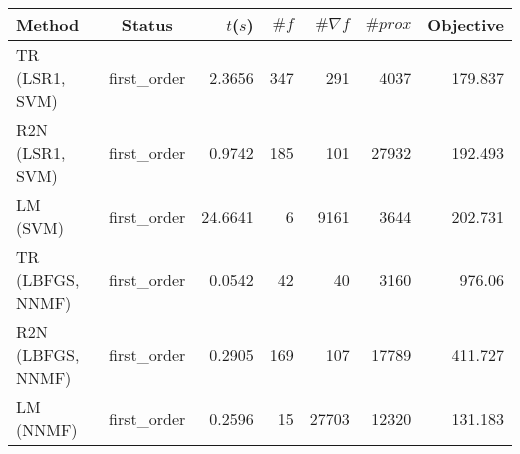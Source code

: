 \begin{tabular}{lcrrrrr}
  \hline
  \textbf{Method} & \textbf{Status} & \textbf{$t$($s$)} & \textbf{$\#f$} & \textbf{$\#\nabla f$} & \textbf{$\#prox$} & \textbf{Objective} \\\hline
  TR (LSR1, SVM) & first\_order & 2.3656 & 347 & 291 & 4037 & 179.837 \\
  R2N (LSR1, SVM) & first\_order & 0.9742 & 185 & 101 & 27932 & 192.493 \\
  LM (SVM) & first\_order & 24.6641 & 6 & 9161 & 3644 & 202.731 \\
  \hline
  TR (LBFGS, NNMF) & first\_order & 0.0542 & 42 & 40 & 3160 & 976.06 \\
  R2N (LBFGS, NNMF) & first\_order & 0.2905 & 169 & 107 & 17789 & 411.727 \\
  LM (NNMF) & first\_order & 0.2596 & 15 & 27703 & 12320 & 131.183 \\\hline
\end{tabular}
